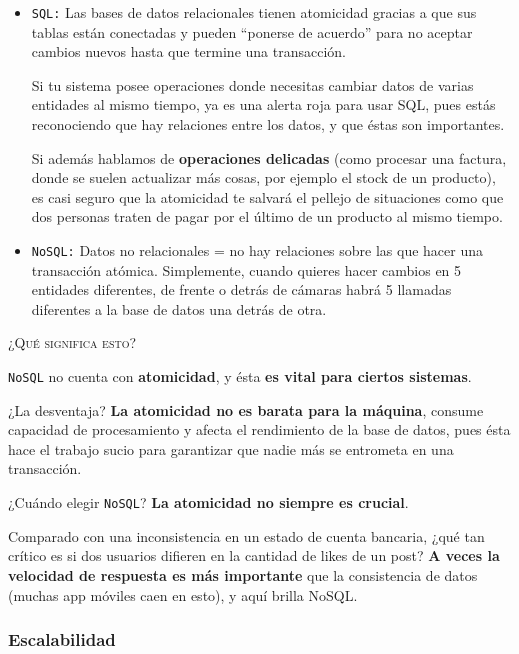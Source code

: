 \begin{itemize}

	\item \texttt{SQL:} Las bases de datos relacionales tienen atomicidad gracias a que sus tablas están conectadas y pueden “ponerse de acuerdo” para no aceptar cambios nuevos hasta que termine una transacción.
	
	Si tu sistema posee operaciones donde necesitas cambiar datos de varias entidades al mismo tiempo, ya es una alerta roja para usar SQL, pues estás reconociendo que hay relaciones entre los datos, y que éstas son importantes.
	
	Si además hablamos de \textbf{operaciones delicadas} (como procesar una factura, donde se suelen actualizar más cosas, por ejemplo el stock de un producto), es casi seguro que la atomicidad te salvará el pellejo de situaciones como que dos personas traten de pagar por el último de un producto al mismo tiempo.

	\item \texttt{NoSQL:} Datos no relacionales = no hay relaciones sobre las que hacer una transacción atómica. Simplemente, cuando quieres hacer cambios en 5 entidades diferentes, de frente o detrás de cámaras habrá 5 llamadas diferentes a la base de datos una detrás de otra.

\end{itemize}

\textsc{¿Qué significa esto?}

\texttt{NoSQL} no cuenta con \textbf{atomicidad}, y ésta \textbf{es vital para ciertos sistemas}.

¿La desventaja? \textbf{La atomicidad no es barata para la máquina}, consume capacidad de procesamiento y afecta el rendimiento de la base de datos, pues ésta hace el trabajo sucio para garantizar que nadie más se entrometa en una transacción.

¿Cuándo elegir \texttt{NoSQL}? \textbf{La atomicidad no siempre es crucial}.

Comparado con una inconsistencia en un estado de cuenta bancaria, ¿qué tan crítico es si dos usuarios difieren en la cantidad de likes de un post? \textbf{A veces la velocidad de respuesta es más importante} que la consistencia de datos (muchas app móviles caen en esto), y aquí brilla NoSQL.	

\subsubsection*{Escalabilidad}

